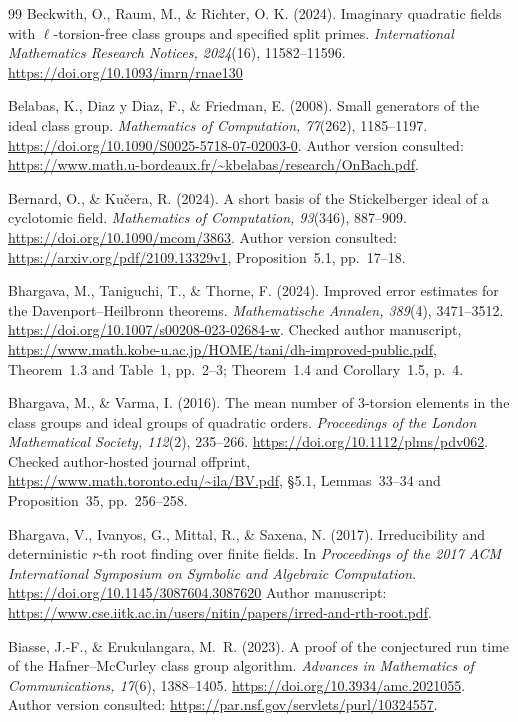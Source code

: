 \documentclass[11pt]{article}
\theoremstyle{definition}
\theoremstyle{remark}
\begin{document}
\begin{thebibliography}{99}
Beckwith, O., Raum, M., \& Richter, O. K. (2024).
Imaginary quadratic fields with $\ell$-torsion-free class groups and
specified split primes.
\emph{International Mathematics Research Notices, 2024}(16),
11582--11596. \url{https://doi.org/10.1093/imrn/rnae130}

Belabas, K., Diaz y Diaz, F., \& Friedman, E. (2008).
Small generators of the ideal class group.
\emph{Mathematics of Computation, 77}(262), 1185--1197.
\url{https://doi.org/10.1090/S0025-5718-07-02003-0}.
Author version consulted: \url{https://www.math.u-bordeaux.fr/~kbelabas/research/OnBach.pdf}.

Bernard, O., \& Ku\v{c}era, R. (2024).
A short basis of the Stickelberger ideal of a cyclotomic field.
\emph{Mathematics of Computation, 93}(346), 887--909.
\url{https://doi.org/10.1090/mcom/3863}.
Author version consulted: \url{https://arxiv.org/pdf/2109.13329v1},
Proposition~5.1, pp.~17--18.

Bhargava, M., Taniguchi, T., \& Thorne, F. (2024).
Improved error estimates for the Davenport--Heilbronn theorems.
\emph{Mathematische Annalen, 389}(4), 3471--3512.
\url{https://doi.org/10.1007/s00208-023-02684-w}.
Checked author manuscript,
\url{https://www.math.kobe-u.ac.jp/HOME/tani/dh-improved-public.pdf},
Theorem~1.3 and Table~1, pp.~2--3; Theorem~1.4 and Corollary~1.5,
p.~4.

Bhargava, M., \& Varma, I. (2016).
The mean number of 3-torsion elements in the class groups and ideal
groups of quadratic orders.
\emph{Proceedings of the London Mathematical Society, 112}(2),
235--266.
\url{https://doi.org/10.1112/plms/pdv062}.
Checked author-hosted journal offprint,
\url{https://www.math.toronto.edu/~ila/BV.pdf},
\S5.1, Lemmas~33--34 and Proposition~35, pp.~256--258.

Bhargava, V., Ivanyos, G., Mittal, R., \& Saxena, N. (2017).
Irreducibility and deterministic $r$-th root finding over finite fields.
In \emph{Proceedings of the 2017 ACM International Symposium on Symbolic
and Algebraic Computation}.
\url{https://doi.org/10.1145/3087604.3087620}
Author manuscript:
\url{https://www.cse.iitk.ac.in/users/nitin/papers/irred-and-rth-root.pdf}.

Biasse, J.-F., \& Erukulangara, M.~R. (2023).
A proof of the conjectured run time of the Hafner--McCurley class group algorithm.
\emph{Advances in Mathematics of Communications, 17}(6), 1388--1405.
\url{https://doi.org/10.3934/amc.2021055}.
Author version consulted: \url{https://par.nsf.gov/servlets/purl/10324557}.


\end{thebibliography}
\end{document}
